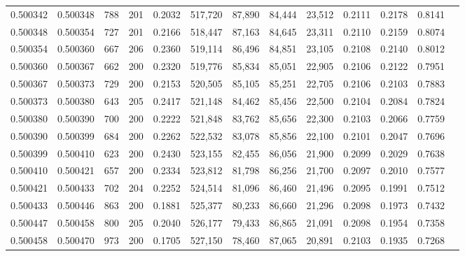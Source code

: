 \begin{tabular}{rrrrrrrrrrrrr}
0.500342 & 0.500348 &   788 & 201 &                                     0.2032 & 517,720 &  87,890 &  84,444 &  23,512 & 0.2111 & 0.2178 & 0.8141 \\
0.500348 & 0.500354 &   727 & 201 &                                     0.2166 & 518,447 &  87,163 &  84,645 &  23,311 & 0.2110 & 0.2159 & 0.8074 \\
0.500354 & 0.500360 &   667 & 206 &                                     0.2360 & 519,114 &  86,496 &  84,851 &  23,105 & 0.2108 & 0.2140 & 0.8012 \\
0.500360 & 0.500367 &   662 & 200 &                                     0.2320 & 519,776 &  85,834 &  85,051 &  22,905 & 0.2106 & 0.2122 & 0.7951 \\
0.500367 & 0.500373 &   729 & 200 &                                     0.2153 & 520,505 &  85,105 &  85,251 &  22,705 & 0.2106 & 0.2103 & 0.7883 \\
0.500373 & 0.500380 &   643 & 205 &                                     0.2417 & 521,148 &  84,462 &  85,456 &  22,500 & 0.2104 & 0.2084 & 0.7824 \\
0.500380 & 0.500390 &   700 & 200 &                                     0.2222 & 521,848 &  83,762 &  85,656 &  22,300 & 0.2103 & 0.2066 & 0.7759 \\
0.500390 & 0.500399 &   684 & 200 &                                     0.2262 & 522,532 &  83,078 &  85,856 &  22,100 & 0.2101 & 0.2047 & 0.7696 \\
0.500399 & 0.500410 &   623 & 200 &                                     0.2430 & 523,155 &  82,455 &  86,056 &  21,900 & 0.2099 & 0.2029 & 0.7638 \\
0.500410 & 0.500421 &   657 & 200 &                                     0.2334 & 523,812 &  81,798 &  86,256 &  21,700 & 0.2097 & 0.2010 & 0.7577 \\
0.500421 & 0.500433 &   702 & 204 &                                     0.2252 & 524,514 &  81,096 &  86,460 &  21,496 & 0.2095 & 0.1991 & 0.7512 \\
0.500433 & 0.500446 &   863 & 200 &                                     0.1881 & 525,377 &  80,233 &  86,660 &  21,296 & 0.2098 & 0.1973 & 0.7432 \\
0.500447 & 0.500458 &   800 & 205 &                                     0.2040 & 526,177 &  79,433 &  86,865 &  21,091 & 0.2098 & 0.1954 & 0.7358 \\
0.500458 & 0.500470 &   973 & 200 &                                     0.1705 & 527,150 &  78,460 &  87,065 &  20,891 & 0.2103 & 0.1935 & 0.7268 \\

\end{tabular}
